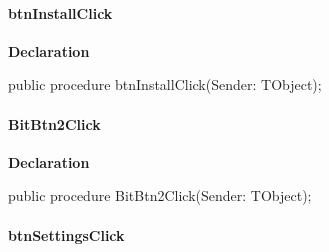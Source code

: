 \documentclass{report}
\newif\ifpdf
\begin{document}
\paragraph*{btnInstallClick}\hspace*{\fill}

\label{manager.TMnFrm-btnInstallClick}
\begin{list}{}{
\setlength{\itemindent}{0cm}
\setlength{\listparindent}{0cm}
\setlength{\leftmargin}{\evensidemargin}
\addtolength{\leftmargin}{\tmplength}
\settowidth{\labelsep}{X}
\addtolength{\leftmargin}{\labelsep}
\setlength{\labelwidth}{\tmplength}
}
\item[\textbf{Declaration}\hfill]
\ifpdf
\begin{flushleft}
\fi
\begin{ttfamily}
public procedure btnInstallClick(Sender: TObject);\end{ttfamily}

\ifpdf
\end{flushleft}
\fi

\end{list}
\paragraph*{BitBtn2Click}\hspace*{\fill}

\label{manager.TMnFrm-BitBtn2Click}
\begin{list}{}{
\setlength{\itemindent}{0cm}
\setlength{\listparindent}{0cm}
\setlength{\leftmargin}{\evensidemargin}
\addtolength{\leftmargin}{\tmplength}
\settowidth{\labelsep}{X}
\addtolength{\leftmargin}{\labelsep}
\setlength{\labelwidth}{\tmplength}
}
\item[\textbf{Declaration}\hfill]
\ifpdf
\begin{flushleft}
\fi
\begin{ttfamily}
public procedure BitBtn2Click(Sender: TObject);\end{ttfamily}

\ifpdf
\end{flushleft}
\fi

\end{list}
\paragraph*{btnSettingsClick}\hspace*{\fill}
\end{document}
